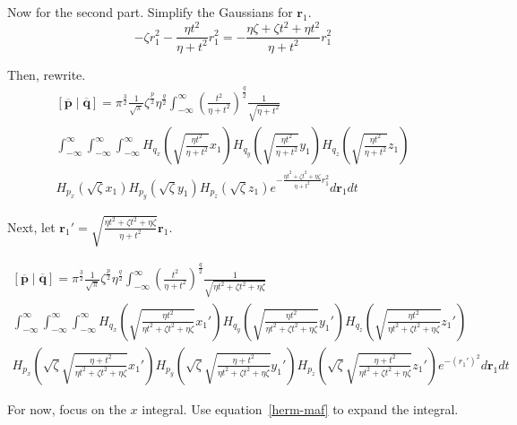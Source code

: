 \documentclass{article}
\begin{document}
Now for the second part. Simplify the Gaussians for $\mathbf{r}_1$.
\begin{equation}
  -\zeta r_1^2 - \frac{\eta t^2}{\eta + t^2} r_1^2 = -\frac{\eta\zeta + \zeta t^2 + \eta t^2}{\eta + t^2} r_1^2 
\end{equation}

Then, rewrite.
\begin{multline}
  \left[\overline{\mathbf{p}}\middle|\overline{\mathbf{q}}\right] =
  \pi^{\frac{3}{2}} \frac{1}{\sqrt{\pi}} \zeta^{\frac{p}{2}}
  \eta^{\frac{q}{2}} \int_{-\infty}^\infty \left(\frac{t^2}{\eta +
      t^2}\right)^{\frac{q}{2}}\frac{1}{\sqrt{\eta + t^2}} \\
  \int_{-\infty}^\infty \int_{-\infty}^\infty\int_{-\infty}^\infty H_{q_x}\left(\sqrt{\frac{\eta t^2}{\eta + t^2}}x_1\right)H_{q_y}\left(\sqrt{\frac{\eta t^2}{\eta + t^2}}y_1\right)H_{q_z}\left(\sqrt{\frac{\eta t^2}{\eta + t^2}}z_1\right)\\
  H_{p_x}\left(\sqrt{\zeta} x_1\right) H_{p_y}\left(\sqrt{\zeta} y_1\right) H_{p_z}\left(\sqrt{\zeta} z_1\right) e^{-\frac{\eta t^2 + \zeta t^2 + \eta \zeta}{\eta + t^2}r_1^2} d\mathbf{r}_1 dt  
\end{multline}

Next, let $\mathbf{r}_1' = \sqrt{\frac{\eta t^2 + \zeta t^2 + \eta \zeta}{\eta + t^2}}\mathbf{r}_1$.

\begin{multline}
  \left[\overline{\mathbf{p}}\middle|\overline{\mathbf{q}}\right] =
  \pi^{\frac{3}{2}} \frac{1}{\sqrt{\pi}} \zeta^{\frac{p}{2}}
  \eta^{\frac{q}{2}} \int_{-\infty}^\infty \left(\frac{t^2}{\eta +
      t^2}\right)^{\frac{q}{2}}\frac{1}{\sqrt{\eta t^2 + \zeta t^2 + \eta \zeta}}\\
  \int_{-\infty}^\infty \int_{-\infty}^\infty \int_{-\infty}^\infty H_{q_x}\left(\sqrt{\frac{\eta t^2}{\eta t^2 + \zeta t^2 + \eta \zeta}}x_1'\right)H_{q_y}\left(\sqrt{\frac{\eta t^2}{\eta t^2 + \zeta t^2 + \eta \zeta}}y_1'\right)H_{q_z}\left(\sqrt{\frac{\eta t^2}{\eta t^2 + \zeta t^2 + \eta \zeta}}z_1'\right)\\
  H_{p_x}\left(\sqrt{\zeta}\sqrt{\frac{\eta + t^2}{\eta t^2 + \zeta t^2 + \eta \zeta}}x_1'\right) H_{p_y}\left(\sqrt{\zeta}\sqrt{\frac{\eta + t^2}{\eta t^2 + \zeta t^2 + \eta \zeta}}y_1'\right) H_{p_z}\left(\sqrt{\zeta}\sqrt{\frac{\eta + t^2}{\eta t^2 + \zeta t^2 + \eta \zeta}}z_1'\right) e^{-\left(r_1'\right)^2} d\mathbf{r}_1 dt  
\end{multline}

For now, focus on the $x$ integral. Use equation~\ref{herm-maf} to expand the integral.
\end{document}
